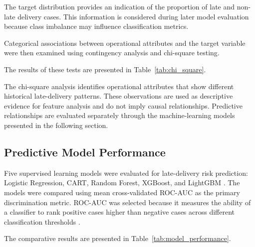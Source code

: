 \documentclass[10pt,a4paper]{article}
\providecommand{\Description}[1]{}
\begin{document}
The target distribution provides an indication of the proportion of
late and non-late delivery cases. This information is considered during
later model evaluation because class imbalance may influence
classification metrics.

Categorical associations between operational attributes and the target
variable were then examined using contingency analysis and chi-square
testing.

The results of these tests are presented in
Table~\ref{tab:chi_square}.

\begin{table}[htbp]
\caption{Chi-square analysis of categorical operational attributes.}
\Description{Table presenting the results of the chi-square analysis for categorical operational attributes, showing statistical association metrics with the late-delivery risk outcome.}
\label{tab:chi_square}
\centering

\end{table}

The chi-square analysis identifies operational attributes that show
different historical late-delivery patterns. These observations are
used as descriptive evidence for feature analysis and do not imply
causal relationships. Predictive relationships are evaluated separately
through the machine-learning models presented in the following section.

\subsection{Predictive Model Performance}

Five supervised learning models were evaluated for late-delivery risk
prediction: Logistic Regression, CART, Random Forest, XGBoost, and
LightGBM \cite{breiman1984classification,breiman2001random,chen2016xgboost,ke2017lightgbm}.
The models were compared using mean cross-validated ROC-AUC as the
primary discrimination metric. ROC-AUC was selected because it measures
the ability of a classifier to rank positive cases higher than negative
cases across different classification thresholds \cite{fawcett2006introduction}.

The comparative results are presented in Table~\ref{tab:model_performance}.

\begin{table}[htbp]
\centering
\caption{Predictive Model Performance}
\Description{Table comparing the predictive performance metrics, including mean cross-validated ROC-AUC scores, for the evaluated machine-learning models.}
\label{tab:model_performance}

\end{table}
\end{document}
